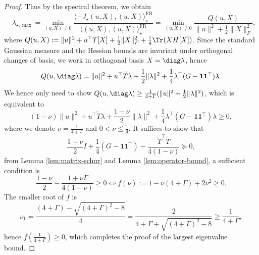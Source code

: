 \begin{proof}
    Thus by the spectral theorem, we obtain
    \begin{equation*}
        -\lambda_{\star, \max} = \min_{(u, X) \neq 0} \frac{\langle -J_\star (u, X), (u, X) \rangle_\star^\mathrm{FR}}{\langle (u, X), (u, X) \rangle_\star^\mathrm{FR}} = \min_{(u, X) \ne 0} \frac{Q(u, X)}{\|u\|^2 + \frac{1}{2} \|X\|_F^2},
    \end{equation*}
    where $Q(u, X) := \|u\|^2 + u^\top T[X] + \frac{1}{2} \|X\|_F^2 + \frac{1}{4} \Tr(X H[X])$. 
    Since the standard Gaussian measure and the Hessian bounds are invariant under orthogonal changes of basis, we work in orthogonal basis $X = \diag \lambda$, hence
    \begin{equation*}
        Q(u, \diag \lambda) = \|u\|^2 + u^\top \widetilde{T} \lambda + \frac{1}{2} \|\lambda\|^2 + \frac{1}{4} \lambda^\top (G - \mathbf{1} \mathbf{1}^\top) \lambda.
    \end{equation*}
    We hence only need to show $Q(u, \diag \lambda) \geq \frac{1}{4 + \Gamma} (\|u\|^2 + \frac{1}{2} \|\lambda\|^2)$, which is equivalent to 
    \begin{equation*}
        \left( 1 - \nu \right) \|u\|^2 + u^\top \widetilde{T} \lambda + \frac{1 - \nu}{2} \|\lambda\|^2 + \frac{1}{4} \lambda^\top (G - \mathbf{1} \mathbf{1}^\top) \lambda \geq 0,
    \end{equation*}
    where we denote $\nu = \frac{1}{4 + \Gamma}$ and $0 < \nu \leq \frac{1}{4}$.
    It suffices to show that
    \begin{equation*}
        \frac{1 - \nu}{2} I + \frac{1}{4} (G - \mathbf{1} \mathbf{1}^\top) - \frac{\widetilde{T}^\top \widetilde{T}}{4(1 - \nu)} \succeq 0,
    \end{equation*}
    from Lemma \ref{lem:matrix-schur} and Lemma \ref{lem:operator-bound}, a sufficient condition is
    \begin{equation*}
        \frac{1 - \nu}{2} - \frac{1 + \nu \Gamma}{4 (1 - \nu)} \geq 0 \Longleftrightarrow f(\nu) := 1 - \nu (4 + \Gamma) + 2\nu^2 \geq 0.
    \end{equation*}
    The smaller root of $f$ is 
    \begin{equation*}
        \nu_1 = \frac{(4 + \Gamma) - \sqrt{(4 + \Gamma)^2 - 8}}{4} = \frac{2}{4 + \Gamma + \sqrt{(4 + \Gamma)^2 - 8}} \geq \frac{1}{4 + \Gamma},
    \end{equation*}
    hence $f (\frac{1}{4 + \Gamma}) \geq 0$, which completes the proof of the largest eigenvalue bound. 


\end{proof}
